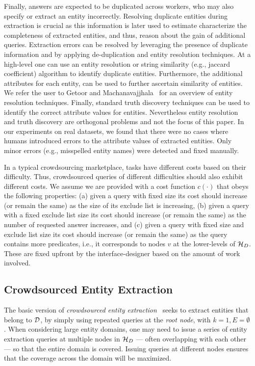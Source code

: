 \iftr
Finally, answers are expected to be duplicated across workers, who may also specify or extract an entity incorrectly. Resolving duplicate entities during extraction is crucial as this information is later used to estimate characterize the completeness of extracted entities, and thus, reason about the gain of additional queries.  Extraction errors can be resolved by leveraging the presence of duplicate information and by applying de-duplication and entity resolution techniques. At a high-level one can use an entity resolution or string similarity (e.g., jaccard coefficient) algorithm to identify duplicate entities. Furthermore, the additional attributes for each entity, can be used to further ascertain similarity of entities. We refer the user to Getoor and Machanavajjhala~\cite{getoor:kdd13} for an overview of entity resolution techniques. Finally, standard truth discovery techniques can be used to identify the correct attribute values for entities. Nevertheless entity resolution and truth discovery are orthogonal problems and not the focus of this paper. In our experiments on real datasets, we found that there were no cases where humans introduced errors to the attribute values of extracted entities. Only minor errors (e.g., misspelled entity names) were detected and fixed manually. \fi

 In a typical crowdsourcing marketplace, tasks have different costs based on their difficulty. Thus, crowdsourced queries of different difficulties should also exhibit different costs. We assume we are provided with a cost function $c(\cdot)$ that obeys the following properties:  (a) given a query with fixed size its cost should increase (or remain the same) as the size of its exclude list is increasing, (b) given a query with a fixed exclude list size its cost should increase (or remain the same) as the number of requested answer increases, and (c) given a query with fixed size and exclude list size its cost should increase (or remain the same) as the query contains more predicates, i.e., it corresponds to nodes $v$ at the lower-levels of $\mathcal{H}_D$. These are fixed upfront by the interface-designer based on the amount of work involved.

\subsection{Crowdsourced Entity Extraction}
\label{sec:extraction}
The basic version of {\em crowdsourced entity extraction}~\cite{trushkowsky:2013} seeks to extract entities that belong to $\mathcal{D}$, by simply using repeated queries at the {\em root node}, with $k = 1, E = \emptyset$. When considering large entity domains, one may need to issue a series of entity extraction queries at multiple nodes in  $\mathcal{H}_D$ --- often overlapping with each other --- so that the entire domain is covered. Issuing queries at different nodes ensures that the coverage across the domain will be maximized. 

